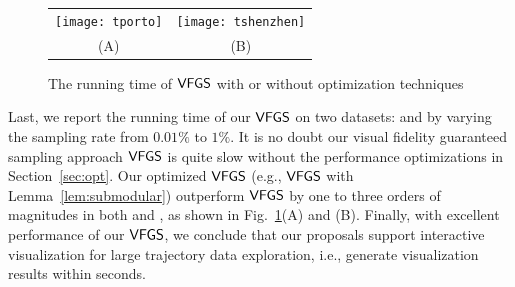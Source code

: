 \begin{figure}
 \centering
 \small
 \begin{tabular}{cc}
   \texttt{[image: tporto]}
   &
   \texttt{[image: tshenzhen]}
   \\
   (A) \pt{}
   &
   (B) \sz{}
 \end{tabular}
 \vspace{-2mm}
 \caption{The running time of $\mathsf{VFGS}$ with or without optimization techniques}
 \label{fig:cost}
 \vspace{-4mm}
\end{figure}


Last, we report the running time of our $\mathsf{VFGS}$ on two datasets: \pt{} and \sz{} by varying the sampling rate from $0.01\%$ to $1\%$.
It is no doubt our visual fidelity guaranteed sampling approach $\mathsf{VFGS}$ is quite slow without the performance optimizations in Section~\ref{sec:opt}.
Our optimized $\mathsf{VFGS}$ (e.g., $\mathsf{VFGS}$ with Lemma~\ref{lem:submodular}) outperform $\mathsf{VFGS}$ by one to three orders of magnitudes in both \pt{} and \sz{}, as shown in Fig.~\ref{fig:cost}(A) and (B).
Finally, with excellent performance of our $\mathsf{VFGS}$, we conclude that our proposals support interactive visualization for large trajectory data exploration, i.e., generate visualization results within seconds.

